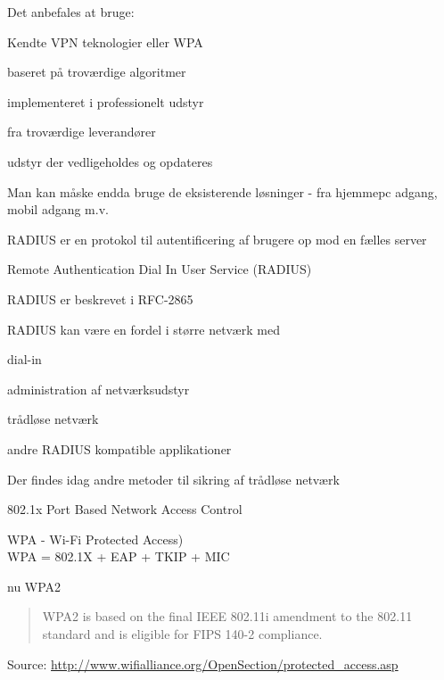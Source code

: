 \documentclass[20pt,landscape,a4paper,footrule]{foils}
\begin{document}
\begin{list1}
\item Det anbefales at bruge:
\item Kendte VPN teknologier eller WPA
\item baseret på troværdige algoritmer
\item implementeret i professionelt udstyr
\item fra troværdige leverandører
\item udstyr der vedligeholdes og opdateres
\item Man kan måske endda bruge de eksisterende løsninger - fra
  hjemmepc adgang, mobil adgang m.v.
\end{list1}


\begin{list1}
\item RADIUS er en protokol til autentificering af brugere op mod en
  fælles server
\item Remote Authentication Dial In User Service (RADIUS)
\item RADIUS er beskrevet i RFC-2865
\item RADIUS kan være en fordel i større netværk med
\begin{list2}
\item dial-in
\item administration af netværksudstyr
\item trådløse netværk
\item andre RADIUS kompatible applikationer
\end{list2}
\end{list1}

\begin{list1}
\item Der findes idag andre metoder til sikring af trådløse netværk
\item 802.1x Port Based Network Access Control
\item WPA - Wi-Fi Protected Access)\\
WPA = 802.1X + EAP + TKIP + MIC
\item nu WPA2
\begin{quote}
WPA2 is based on the final IEEE 802.11i amendment to the 802.11
standard and is eligible for FIPS 140-2 compliance.
\end{quote}
\item Source:
\href{http://www.wifialliance.org/OpenSection/protected_access.asp}
{http://www.wifialliance.org/OpenSection/protected\_access.asp}
\end{list1}
\end{document}
